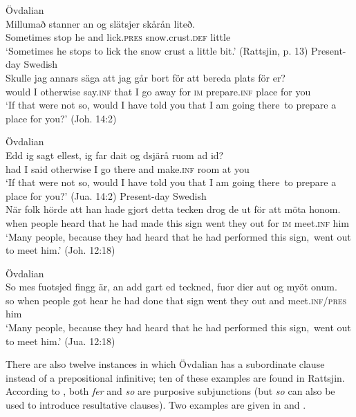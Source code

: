 \documentclass[output=paper]{langscibook}
\begin{document}
\ex Övdalian\label{ex:kalm:17b}\\ 
\gll Millumað stanner an og slätsjer skårån liteð.\\
Sometimes stop he and lick.\textsc{pres} snow.crust.\textsc{def} little\\
\glt ‘Sometimes he stops to lick the snow crust a little bit.’ (Rattsjin, p. 13)
\z 
\ex
\label{ex:kalm:18}
\ea Present-day Swedish\label{ex:kalm:18a}\\
\gll Skulle jag annars säga att jag går bort för att bereda plats för er?\\
would I otherwise say.\textsc{inf} that I go away for \textsc{im} prepare.\textsc{inf} place for you\\
\glt ‘If that were not so, would I have told you that I am going there{~}to prepare a place for you?’ (Joh. 14:2)

\ex Övdalian\label{ex:kalm:18b}\\
\gll Edd ig sagt ellest, ig far dait og dsjärå ruom ad id?\\
had I said otherwise I go there and make.\textsc{inf} room at you\\
 \glt ‘If that were not so, would I have told you that I am going there{~}to prepare a place for you?’ (Jua. 14:2)
\z 
\ex
\label{ex:kalm:19}
\ea Present-day Swedish\label{ex:kalm:19a}\\
\gll När folk hörde att han hade gjort detta tecken drog de ut för att möta honom.\\
when people heard that he had made this sign went they out for \textsc{im} meet.\textsc{inf} him\\
\glt ‘Many people, because they had heard that he had performed this sign,{~}went out to meet him.’ (Joh. 12:18)

\ex Övdalian\label{ex:kalm:19b}\\
\gll So mes fuotsjed fingg är, an add gart ed teckned, fuor dier aut og myöt onum.\\
so when people got hear he had done that sign went they out and meet.\textsc{inf/pres} him\\
\glt ‘Many people, because they had heard that he had performed this sign,{~}went out to meet him.’ (Jua. 12:18)
\z 
\z 


There are also twelve instances in which Övdalian has a subordinate clause instead of a prepositional infinitive; ten of these examples are found in Rattsjin. According to \citet[491]{AkerbergNystrom2012}, both \textit{fer} and \textit{so} are purposive subjunctions (but \textit{so} can also be used to introduce resultative clauses). Two examples are given in  and .  
\end{document}
